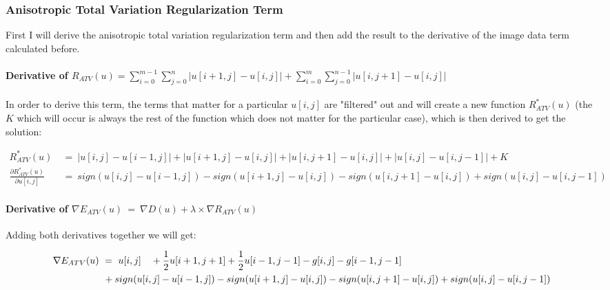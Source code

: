 \documentclass{report}
\begin{document}
				\closesection
			\closesection
			\newpage
			\subsubsection{Anisotropic Total Variation Regularization Term}
			\startsubsection
				First I will derive the anisotropic total variation regularization term and then add the result to the derivative of the image data term calculated before.
				\vspace{-0.4cm} \paragraph{Derivative of $R_{ATV}(u) = \sum_{i=0}^{m-1} \sum_{j=0}^{n} | u[i+1,j] - u[i,j] | + \sum_{i=0}^{m} \sum_{j=0}^{n-1} | u[i,j+1] - u[i,j] |$}
				\startsubsection
					\vspace{0.2cm} In order to derive this term, the terms that matter for a particular $u[i,j]$ are "filtered" out and will create a new function $R_{ATV}^*(u)$ (the $K$ which will occur is always the rest of the function which does not matter for the particular case), which is then derived to get the solution:
				\closesection
				\begin{adjustwidth}{-7em}{}
					\vspace{-0.5cm}
					\begin{align*}
						R_{ATV}^*(u) \ & = \ |u[i,j] - u[i-1,j]| + |u[i+1,j] - u[i,j]| + |u[i,j+1] - u[i,j]| + |u[i,j] - u[i,j-1]| + K \\
						\frac{\partial R_{ATV}^*(u)}{\partial u[i,j]} \ & = \ sign(u[i,j] - u[i-1,j]) - sign(u[i+1,j] - u[i,j]) - sign(u[i,j+1] - u[i,j]) + sign(u[i,j] - u[i,j-1])
					\end{align*}
				\end{adjustwidth}
				\vspace{-0.4cm} \paragraph{Derivative of $\nabla E_{ATV}(u) \ = \ \nabla D(u) + \lambda \times \nabla R_{ATV}(u)$}
				\startsubsection
					Adding both derivatives together we will get:
				\closesection
				\begin{adjustwidth}{-6em}{}
						\vspace{-0.5cm}
						\begin{align*}
						\nabla E_{ATV}(u) \ & = \ u[i,j] && + \frac{1}{2} u[i+1,j+1] + \frac{1}{2} u[i-1,j-1] - g[i,j] - g[i-1,j-1] \\
						&&& \hspace{-1.75cm} + sign(u[i,j] - u[i-1,j]) - sign(u[i+1,j] - u[i,j]) - sign(u[i,j+1] - u[i,j]) + sign(u[i,j] - u[i,j-1])
					\end{align*}
				\end{adjustwidth}
			\closesection
		\closesection
		
\end{document}
